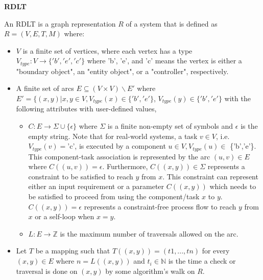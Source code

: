         \begin{definition} \textbf{RDLT} \cite{malinao-rdlt}
        
        An RDLT is a graph representation $R$ of a system that is defined as $R = (V, E, T, M)$ where:

            \begin{itemize}
            
                \item $V$ is a finite set of vertices, where each vertex has a type $V_{type}: V \rightarrow \{'b', 'e', 'c'\}$ where 'b', 'e', and 'c' means the vertex is either a "boundary object", an "entity object", or a "controller", respectively.
                
                \item A finite set of arcs $E \subseteq (V \times V) \backslash  E'$ where $E' = \{(x,y) | x,y \in V, V_{type}(x) \in \{'b', 'e'\}$, $V_{type}(y) \in \{'b', 'e'\}$ with the following attributes with user-defined values,
                
                \begin{itemize}
                    
                    \item $C : E \rightarrow \Sigma \cup \{\epsilon\}$ where $\Sigma$ is a finite non-empty set of symbols and $\epsilon$ is the empty string. Note that for real-world systems, a task $v \in V$, i.e. $V_{type}(v) = $'c', is executed by a component $u \in V, V_{type}(u) \in $ \{'b','e'\}. This component-task association is represented by the arc $(u, v) \in E$ where $C((u,v)) = \epsilon$. Furthermore, $C((x,y)) \in \Sigma$ represents a constraint to be satisfied to reach $y$ from $x$. This constraint can represent either an input requirement or a parameter $C((x,y))$ which needs to be satisfied to proceed from using the component/task $x$ to $y$. $C((x,y)) = \epsilon$ represents a constraint-free process flow to reach $y$ from $x$ or a self-loop when $x = y$.
                    
                    \item $L : E \rightarrow \mathbb{Z}$ is the maximum number of traversals allowed on the arc.
                    
                \end{itemize}
            
                \item Let $T$ be a mapping such that $T((x, y)) = (t1,...,tn)$ for every $(x, y) \in E$ where $n = L((x, y))$ and $ t_{i} \in \mathbb{N}$ is the time a check or traversal is done on $(x, y)$ by some algorithm’s walk on $R$.
                    

\end{itemize}
\end{definition}
